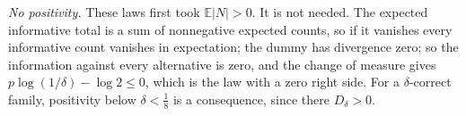 \emph{No positivity.} These laws first took $\mathbb E|N|>0$. It is not needed. The expected
informative total is a sum of nonnegative expected counts, so if it vanishes every informative
count vanishes in expectation; the dummy has divergence zero; so the information against every
alternative is zero, and the change of measure gives $p\log(1/\delta)-\log2\le0$, which is the
law with a zero right side. For a $\delta$-correct family, positivity below $\delta<\frac18$ is a
consequence, since there $D_\delta>0$.

